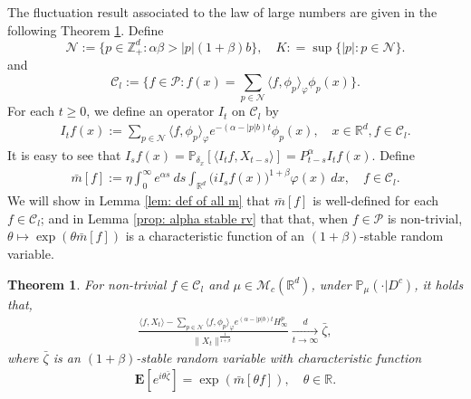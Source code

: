 \documentclass[12pt,a4paper]{amsart}
\theoremstyle{plain}
\newtheorem{thm}{Theorem}[section]
\theoremstyle{definition}
\numberwithin{equation}{section}
\begin{document}
    The fluctuation result associated to the law of large numbers are given in the following Theorem \ref{thm: large clt}.
Define
\begin{equation}
\label{eq: def of N}
    \mathcal{N}:=\{p\in \mathbb{Z}_+^d:  \alpha\beta>|p|(1+\beta)b\},
    \quad K : = \sup\{|p|: p \in \mathcal N\}.
\end{equation}
    and
\begin{equation}
\label{eq: def of Cl}
    \mathcal{C}_l:=\Big\{f\in \mathcal P: f(x)=\sum_{p\in\mathcal{N}}\langle f, \phi_p\rangle_{\varphi}\phi_p(x)\Big\}.
\end{equation}
    For each $t\ge 0$, we define an operator $I_t$ on $\mathcal{C}_l$ by
\begin{align}\label{definition of Itf}
    I_tf(x)
    :=\sum_{p\in \mathcal{N}}\langle f, \phi_p\rangle_{\varphi} e^{-(\alpha-|p|b)t}\phi_p(x),
   \quad x\in \mathbb{R}^d, f\in \mathcal C_l.
\end{align}
    It is easy to see that $I_sf(x)=\mathbb{P}_{\delta_x}[\langle I_t f, X_{t-s}\rangle]=P_{t-s}^{\alpha}I_tf(x)$.
    Define
\begin{align}\label{bar-m}
   \bar{m}[f]
   :=\eta \int_{0}^{\infty} e^{\alpha s}~ds \int_{\mathbb R^d} \big(iI_sf(x)\big)^{1+\beta}\varphi(x)~dx,
   \quad f\in \mathcal C_l.
\end{align}
    We will show in Lemma \ref{lem: def of all m} that $\bar{m}[f]$ is well-defined for each $f\in \mathcal C_l$; and in Lemma \ref{prop: alpha stable rv} that that, when $f\in \mathcal{P}$ is non-trivial, $\theta \mapsto \exp(\theta \bar m[f])$ is a characteristic function of an $(1+\beta)$-stable random variable.
\begin{thm}
\label{thm: large clt}
    For non-trivial $f\in\mathcal{C}_l$ and $\mu\in \mathcal{M}_c(\mathbb{R}^d)$, under $\mathbb{P}_{\mu}(\cdot|D^c)$, it holds that,
\begin{align}\label{thm: large rate}
    \frac{\langle f, X_t\rangle-\sum_{p\in\mathcal{N}}\langle f,\phi_p\rangle_\varphi e^{(\alpha-|p|b)t}H^p_{\infty}}{\|X_t\|^\frac{1}{1+\beta}}\xrightarrow[t\to \infty]{d}\bar{\zeta},
\end{align}
    where $\bar{\zeta}$ is an $(1+\beta)$-stable random variable with characteristic function
\begin{align}
    \mathbf{E}[e^{i\theta\bar{\zeta}}]=\exp(\bar{m}[\theta f]),\quad \theta\in \mathbb{R}.
\end{align}
\end{thm}
\end{document}
